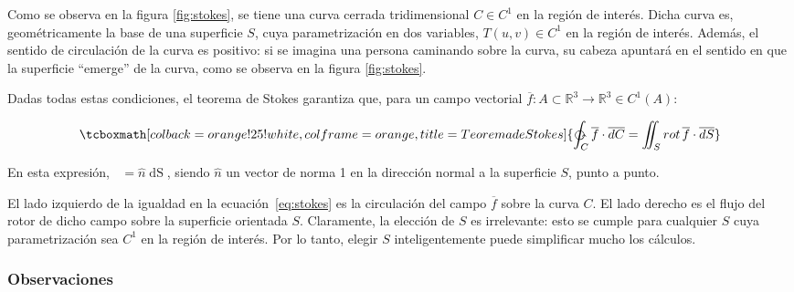 \documentclass{article}
\renewcommand{\Bbb}{\mathbb}
\begin{document}
Como se observa en la figura \ref{fig:stokes}, se tiene una curva cerrada tridimensional $C \in C^1$ en la región de interés. Dicha curva es, geométricamente la base de una superficie $S$, cuya parametrización en dos variables, $T(u,v) \in C^1$ en la región de interés. Además, el sentido de circulación de la curva  es positivo: si se imagina una persona caminando sobre la curva, su cabeza apuntará en el sentido en que la superficie ``emerge'' de la curva, como se observa en la figura \ref{fig:stokes}.

Dadas todas estas condiciones, el teorema de Stokes garantiza que, para un campo vectorial $\overline{f}: A \subset \Bbb R^3 \rightarrow \Bbb R^3 \in C^1(A)$:

\begin{equation}
\tcboxmath[colback=orange!25!white,colframe=orange, title=Teorema de Stokes]
{ \ointctrclockwise_C \overline{f} \cdot \mathop{\overline{dC}} = \iint_S \mathop{rot}\overline{f} \cdot \mathop{\overline{dS}}
 }
\label{eq:stokes}
\end{equation}

En esta expresión, $\mathop{\overline{dS}} = \hat{n} \mathop{dS}$, siendo $\hat{n}$ un vector de norma 1 en la dirección normal a la superficie $S$, punto a punto.

El lado izquierdo de la igualdad en la ecuación~\ref{eq:stokes} es la circulación del campo $\overline{f}$ sobre la curva $C$. El lado derecho es el flujo del rotor de dicho campo sobre la superficie orientada $S$. Claramente, la elección de $S$ es irrelevante: esto se cumple para cualquier $S$ cuya parametrización sea $C^1$ en la región de interés. Por lo tanto, elegir $S$ inteligentemente puede simplificar mucho los cálculos.

\subsubsection{Observaciones}
\end{document}

